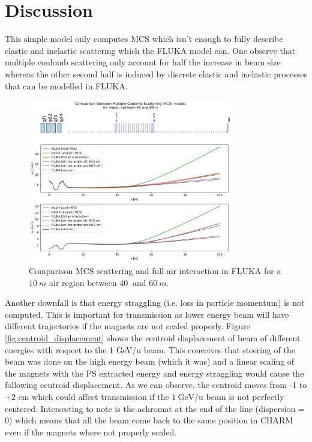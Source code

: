 \documentclass{cernatsnote}
\begin{document}
\newpage
\section{Discussion}

This simple model only computes MCS which isn't enough to fully describe elastic and inelastic scattering which the FLUKA model can. One observe that multiple coulomb scattering only account for half the increase in beam size whereas the other second half is induced by discrete elastic and inelastic processes that can be modelled in FLUKA. 

\begin{figure}[!htb]
\centering
\includegraphics[width=0.8\textwidth]{images/compare_simulation.png}
\caption{Comparison MCS scattering and full air interaction in FLUKA for a $\SI{10}{m}$ air region between $\SI{40}{}$ and $\SI{60}{m}$.}
\label{fig:compare_simulation}
\end{figure}

Another downfall is that energy straggling (i.e. loss in particle momentum) is not computed. This is important for transmission as lower energy beam will have different trajectories if the magnets are not scaled properly. Figure \ref{fig:centroid_displacement} shows the centroid displacement of beam of different energies with respect to the 1 GeV/u beam. This conceives that steering of the beam was done on the high energy beam (which it was) and a linear scaling of the magnets with the PS extracted energy and energy straggling would cause the following centroid displacement. As we can observe, the centroid moves from -1 to +2 cm which could affect transmission if the $\SI{1}{\giga\electronvolt\per\text{u}}$ beam is not perfectly centered. Intersesting to note is the achromat at the end of the line (dispersion = 0) which means that all the beam come back to the same position in CHARM even if the magnets where not properly scaled.
\end{document}
